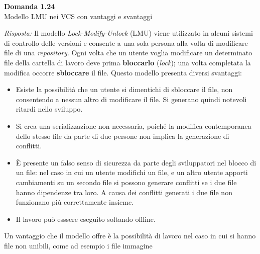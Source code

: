 \documentclass{article}
\newenvironment{problem}[2][Domanda]
    { \begin{mdframed}[backgroundcolor=gray!20] \textbf{#1 #2} \\}
    {  \end{mdframed}}
\newenvironment{solution}
    {\textit{Risposta:}}
    {}
\begin{document}
\begin{problem}{1.24}
Modello LMU nei VCS con vantaggi e svantaggi
\end{problem}
\begin{solution}
Il modello \textit{Lock-Modify-Unlock} (LMU) viene utilizzato in alcuni sistemi di controllo delle versioni e consente a una sola persona alla volta di modificare file di una \textit{repository}.
Ogni volta che un utente voglia modificare un determinato file della cartella di lavoro deve prima \textbf{bloccarlo} (\textit{lock}); una volta completata la modifica occorre \textbf{sbloccare} il file.
Questo modello presenta diversi svantaggi:
\begin{itemize}
	\item Esiste la possibilità che un utente si dimentichi di sbloccare il file, non consentendo a nessun altro di modificare il file.
	\newline
	Si generano quindi notevoli ritardi nello sviluppo.
	\item Si crea una serializzazione non necessaria, poiché la modifica contemporanea dello stesso file da parte di due persone non implica la generazione di conflitti.
	\item È presente un falso senso di sicurezza da parte degli sviluppatori nel blocco di un file: nel caso in cui un utente modifichi un file, e un altro utente apporti cambiamenti su un secondo file si possono generare conflitti se i due file hanno dipendenze tra loro.
	\newline
	A causa dei conflitti generati i due file non funzionano più correttamente insieme.
	\item Il lavoro può esssere eseguito soltando offline.
\end{itemize}
Un vantaggio che il modello offre è la possibilità di lavoro nel caso in cui si hanno file non unibili, come ad esempio i file immagine
\end{solution}
\end{document}
